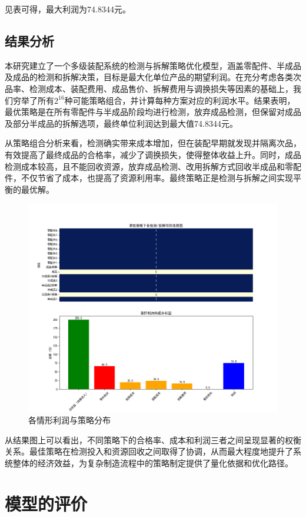 \documentclass[withoutpreface,bwprint]{cumcmthesis}
\begin{document}
见表可得，最大利润为74.8344元。
\subsection{结果分析}
本研究建立了一个多级装配系统的检测与拆解策略优化模型，涵盖零配件、半成品及成品的检测和拆解决策，目标是最大化单位产品的期望利润。在充分考虑各类次品率、检测成本、装配费用、成品售价、拆解费用与调换损失等因素的基础上，我们穷举了所有$2^{16}$种可能策略组合，并计算每种方案对应的利润水平。结果表明，最优策略是在所有零配件与半成品阶段均进行检测，放弃成品检测，但保留对成品及部分半成品的拆解选项，最终单位利润达到最大值74.8344元。

从策略组合分析来看，检测确实带来成本增加，但在装配早期就发现并隔离次品，有效提高了最终成品的合格率，减少了调换损失，使得整体收益上升。同时，成品检测成本较高，且不能回收资源，放弃成品检测、改用拆解方式回收半成品和零配件，不仅节省了成本，也提高了资源利用率。最终策略正是检测与拆解之间实现平衡的最优解。

\begin{figure}[H]
\centering
\includegraphics[width=\textwidth]{figure/final.png}
\caption{各情形利润与策略分布}
\end{figure}
从结果图上可以看出，不同策略下的合格率、成本和利润三者之间呈现显著的权衡关系。最佳策略在检测投入和资源回收之间取得了协调，从而最大程度地提升了系统整体的经济效益，为复杂制造流程中的策略制定提供了量化依据和优化路径。
\section{模型的评价}
\end{document}
